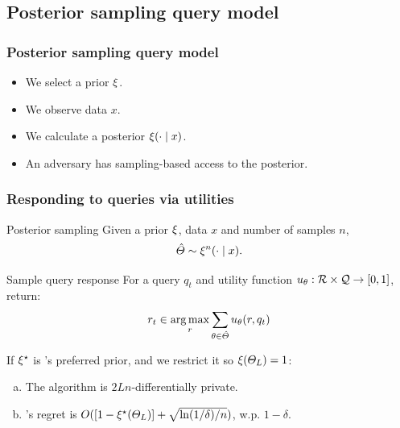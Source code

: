 \subsection{Posterior sampling query model}

\begin{frame}
  \frametitle{Posterior sampling query model}
  \begin{itemize}
  \item<1-> We select a prior $\xi$.
  \item<1-> We observe data $x$.
  \item<1-> We calculate a posterior $\xi(\cdot \mid x)$.
  \item<1-> An adversary has sampling-based access to the posterior.
  \end{itemize}

\end{frame}

\begin{frame}
  \frametitle{Responding to queries via utilities}
  \begin{block}{Posterior sampling}
    Given a prior $\xi$, data $x$ and number of samples $n$,
    \[
    \hat{\Theta} \sim \xi^n( \cdot \mid x).
    \]
  \end{block}
  \begin{block}{Sample query response}
    For a query $q_t$ and utility function $u_\theta : {\mathcal{R}} \times {\mathcal{Q}} \to [0,1]$, return:
    \[
    r_t \in \mathop{\rm arg\,max}_r \sum_{\theta \in \hat{\Theta}} u_\theta(r, q_t)
    \]
  \end{block}
  \begin{theorem}
    If $\xi^\star$ is \Adv{}'s preferred prior, and we restrict it so  $\xi(\Theta_L) = 1$:
    \begin{enumerate}[(a)]
    \item The algorithm is $2 L n$-differentially private.
    \item \Adv{}'s regret is  $O([1 - \xi^\star(\Theta_L)] + \sqrt{\ln (1/\delta)/n})$, w.p. $1 - \delta$.
    \end{enumerate}
  \end{theorem}
\end{frame}

